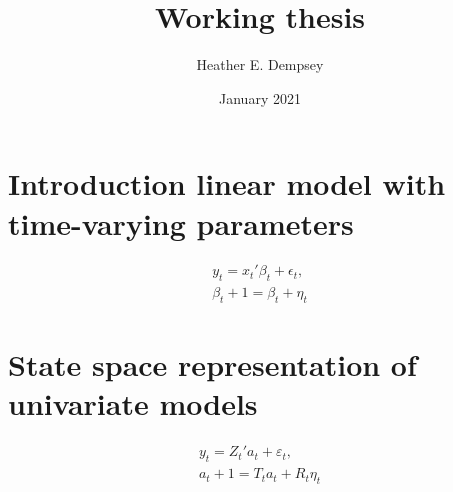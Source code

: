 \documentclass{article}
\title{Working thesis}
\author{Heather E. Dempsey}
\date{January 2021}
\begin{document}
\maketitle
\section{Introduction linear model with time-varying parameters}



\begin{gather*} 
y_t = x_t'\beta_t + \epsilon_t, \\ 
\beta_t+1= \beta_t + \eta_t
\end{gather*}





\maketitle
\section{State space representation of univariate models}



\begin{gather*} 
y_t = Z_t'a_t + \varepsilon_t, \\ 
a_t+1= T_ta_t + R_t\eta_t
\end{gather*}
\end{document}
